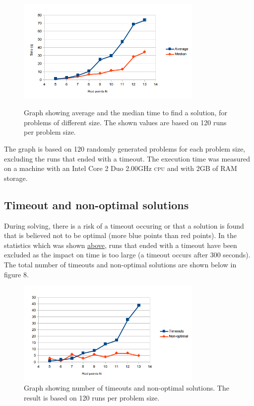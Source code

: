 \documentclass[a4paper,12pt]{article}
\begin{document}
\begin{figure}[h]
\begin{center}
\label{ref:speed}
\includegraphics[width=0.8\textwidth]{pictures/speedStats.png}
 \caption[Close up of \textit{Hemidactylus} sp.]
   {Graph showing average and the median time to find a solution, for problems of different size. The shown values are based on 120 runs per problem size.}
\end{center}
\end{figure}


The graph is based on 120 randomly generated problems for each problem size, excluding the runs that ended with a timeout. The execution time was measured on a machine with an Intel Core 2 Duo 2.00GHz \textsc{cpu} and with 2GB of RAM storage.

\subsection{Timeout and non-optimal solutions}
During solving, there is a risk of a timeout occuring or that a solution is found that is believed not to be optimal (more blue points than red points). In the statistics which was shown \hyperref[sec:speed]{above}, runs that ended with a timeout have been excluded as the impact on time is too large (a timeout occurs after 300 seconds). The total number of timeouts and non-optimal solutions are shown below in figure 8.

\begin{figure}[!ht]
\begin{center}
\includegraphics[width=0.8\textwidth]{pictures/timeouts.png}
 \caption[Close up of \textit{Hemidactylus} sp.]
   {Graph showing number of timeouts and non-optimal solutions. The result is based on 120 runs per problem size.}
\end{center}
\end{figure}
\end{document}
